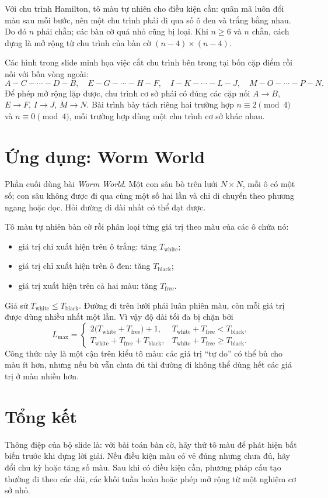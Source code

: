 \documentclass[11pt]{article}
\begin{document}
Với chu trình Hamilton, tô màu tự nhiên cho điều kiện cần: quân mã luôn đổi
màu sau mỗi bước, nên một chu trình phải đi qua số ô đen và trắng bằng nhau.
Do đó \(n\) phải chẵn; các bàn cờ quá nhỏ cũng bị loại. Khi \(n\ge6\) và
\(n\) chẵn, cách dựng là mở rộng từ chu trình của bàn cờ
\((n-4)\times(n-4)\).

Các hình trong slide minh họa việc cắt chu trình bên trong tại bốn cặp điểm
rồi nối với bốn vòng ngoài:
\[
  A-C-\cdots-D-B,\quad
  E-G-\cdots-H-F,\quad
  I-K-\cdots-L-J,\quad
  M-O-\cdots-P-N.
\]
Để phép mở rộng lặp được, chu trình cơ sở phải có đúng các cặp nối
\(A\to B\), \(E\to F\), \(I\to J\), \(M\to N\). Bài trình bày tách riêng hai
trường hợp \(n\equiv2\pmod4\) và \(n\equiv0\pmod4\), mỗi trường hợp dùng một
chu trình cơ sở khác nhau.

\section{Ứng dụng: Worm World}

Phần cuối dùng bài \textit{Worm World}. Một con sâu bò trên lưới \(N\times N\),
mỗi ô có một số; con sâu không được đi qua cùng một số hai lần và chỉ di
chuyển theo phương ngang hoặc dọc. Hỏi đường đi dài nhất có thể đạt được.

Tô màu tự nhiên bàn cờ rồi phân loại từng giá trị theo màu của các ô chứa nó:
\begin{itemize}
  \item giá trị chỉ xuất hiện trên ô trắng: tăng \(T_{\text{white}}\);
  \item giá trị chỉ xuất hiện trên ô đen: tăng \(T_{\text{black}}\);
  \item giá trị xuất hiện trên cả hai màu: tăng \(T_{\text{free}}\).
\end{itemize}
Giả sử \(T_{\text{white}}\le T_{\text{black}}\). Đường đi trên lưới phải luân
phiên màu, còn mỗi giá trị được dùng nhiều nhất một lần. Vì vậy độ dài tối đa
bị chặn bởi
\[
L_{\max}=
\begin{cases}
  2\bigl(T_{\text{white}}+T_{\text{free}}\bigr)+1,
    & T_{\text{white}}+T_{\text{free}}<T_{\text{black}},\\
  T_{\text{white}}+T_{\text{free}}+T_{\text{black}},
    & T_{\text{white}}+T_{\text{free}}\ge T_{\text{black}}.
\end{cases}
\]
Công thức này là một cận trên kiểu tô màu: các giá trị ``tự do'' có thể bù
cho màu ít hơn, nhưng nếu bù vẫn chưa đủ thì đường đi không thể dùng hết các
giá trị ở màu nhiều hơn.

\section{Tổng kết}

Thông điệp của bộ slide là: với bài toán bàn cờ, hãy thử tô màu để phát hiện
bất biến trước khi dựng lời giải. Nếu điều kiện màu có vẻ đúng nhưng chưa đủ,
hãy đổi chu kỳ hoặc tăng số màu. Sau khi có điều kiện cần, phương pháp cấu
tạo thường đi theo các dải, các khối tuần hoàn hoặc phép mở rộng từ một nghiệm
cơ sở nhỏ.
\end{document}

